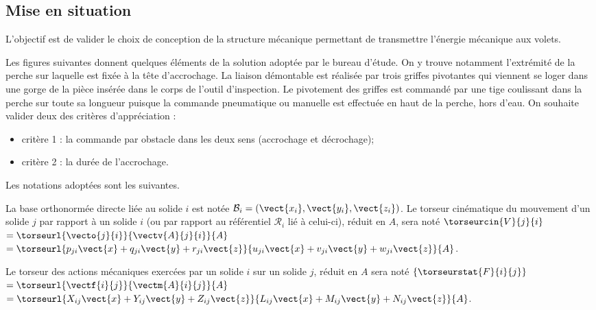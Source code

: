 \begin{multicols}{2}
\section*{Mise en situation}






\begin{obj}
L'objectif est de valider le choix de conception de la structure mécanique permettant
de transmettre l'énergie mécanique aux volets.
\end{obj}

Les figures suivantes donnent quelques éléments de la solution adoptée par le bureau d'étude. On y
trouve notamment l'extrémité de la perche sur laquelle est fixée à la tête d'accrochage. La liaison démontable est
réalisée par trois griffes pivotantes qui viennent se loger dans une gorge de la pièce insérée dans le corps de
l'outil d'inspection. Le pivotement des griffes est commandé par une tige coulissant dans la perche sur toute sa
longueur puisque la commande pneumatique ou manuelle est effectuée en haut de la perche, hors d'eau.
On souhaite valider deux des critères d'appréciation :
\begin{itemize}
\item critère 1 : la commande par obstacle dans les deux sens (accrochage et décrochage);
\item critère 2 : la durée de l'accrochage.
\end{itemize}

Les notations adoptées sont les suivantes.

La base orthonormée directe liée au solide $i$  est notée $\mathcal{B}_i = \left(\vect{x_i},\vect{y_i},\vect{z_i}\right)$. Le torseur cinématique du mouvement d’un solide $j$ par rapport à un solide $i$
(ou par rapport au référentiel $\mathcal{R}_i$ lié à celui-ci), réduit en $A$, sera noté $\torseurcin{V}{j}{i}$ $=\torseurl{\vecto{j}{i}}{\vectv{A}{j}{i}}{A}$ $=\torseurl{p_{ji} \vect{x}+q_{ji}\vect{y}+r_{ji}\vect{z}}{u_{ji} \vect{x}+v_{ji}\vect{y}+w_{ji}\vect{z}}{A}$.%

Le torseur des actions mécaniques exercées par un solide $i$ sur un solide $j$, réduit en $A$ sera noté $\left\{ \torseurstat{F}{i}{j}\right\}$ $=\torseurl{\vectf{i}{j}}{\vectm{A}{i}{j}}{A}$ $=\torseurl{X_{ij}\vect{x}+Y_{ij}\vect{y}+Z_{ij}\vect{z}}{L_{ij} \vect{x}+M_{ij}\vect{y}+N_{ij}\vect{z}}{A}$.%


\end{multicols}
